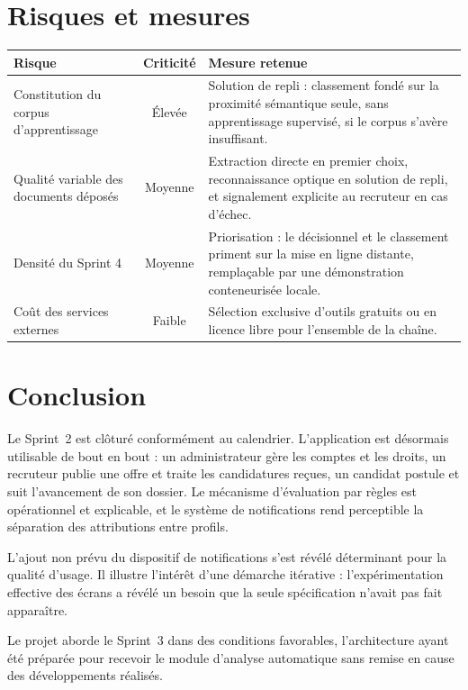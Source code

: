 \documentclass[11pt,a4paper]{article}
\begin{document}
\section{Risques et mesures}

\begin{center}
\begin{tabular}{p{4.6cm}cp{7.4cm}}
  \toprule
  \textbf{Risque} & \textbf{Criticité} & \textbf{Mesure retenue} \\
  \midrule
  Constitution du corpus d'apprentissage & Élevée & Solution de repli : classement fondé sur la proximité sémantique seule, sans apprentissage supervisé, si le corpus s'avère insuffisant. \\[1mm]
  Qualité variable des documents déposés & Moyenne & Extraction directe en premier choix, reconnaissance optique en solution de repli, et signalement explicite au recruteur en cas d'échec. \\[1mm]
  Densité du Sprint 4 & Moyenne & Priorisation : le décisionnel et le classement priment sur la mise en ligne distante, remplaçable par une démonstration conteneurisée locale. \\[1mm]
  Coût des services externes & Faible & Sélection exclusive d'outils gratuits ou en licence libre pour l'ensemble de la chaîne. \\
  \bottomrule
\end{tabular}
\end{center}

\section{Conclusion}
Le Sprint~2 est clôturé conformément au calendrier. L'application est désormais utilisable de bout en bout : un administrateur gère les comptes et les droits, un recruteur publie une offre et traite les candidatures reçues, un candidat postule et suit l'avancement de son dossier. Le mécanisme d'évaluation par règles est opérationnel et explicable, et le système de notifications rend perceptible la séparation des attributions entre profils.

L'ajout non prévu du dispositif de notifications s'est révélé déterminant pour la qualité d'usage. Il illustre l'intérêt d'une démarche itérative : l'expérimentation effective des écrans a révélé un besoin que la seule spécification n'avait pas fait apparaître.

Le projet aborde le Sprint~3 dans des conditions favorables, l'architecture ayant été préparée pour recevoir le module d'analyse automatique sans remise en cause des développements réalisés.
\end{document}
